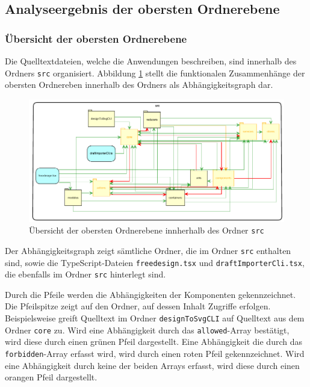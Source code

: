\subsection{Analyseergebnis der obersten Ordnerebene}
\subsubsection{Übersicht der obersten Ordnerebene}
\label{sec:overview}
Die Quelltextdateien, welche die Anwendungen beschreiben, sind innerhalb des Ordners \lstinline|src| organisiert. 
Abbildung \ref{fig:obersteOrdnerebene} stellt die funktionalen Zusammenhänge der obersten Ordnereben innerhalb des Ordners als Abhängigkeitsgraph dar.  
\begin{figure}[H]
	\centering
    \caption{Übersicht der obersten Ordnerebene innherhalb des Ordner \lstinline|src|}
	\label{fig:obersteOrdnerebene}
	\includegraphics{diagrams/Ist-Architektur/Projektuebersicht.pdf}
\end{figure}


Der Abhängigkeitsgraph zeigt sämtliche Ordner, die im Ordner \lstinline|src| enthalten sind, sowie die TypeScript-Dateien \lstinline|freedesign.tsx| und \lstinline|draftImporterCli.tsx|, die ebenfalls im Ordner \lstinline|src| hinterlegt sind.  

Durch die Pfeile werden die Abhängigkeiten der Komponenten gekennzeichnet. Die Pfeilspitze zeigt auf den Ordner, auf dessen Inhalt Zugriffe erfolgen. Beispielsweise greift Quelltext im Ordner \lstinline|designToSvgCLI| auf Quelltext aus dem Ordner \lstinline|core| zu.
Wird eine Abhängigkeit durch das \lstinline|allowed|-Array bestätigt, wird diese durch einen grünen Pfeil dargestellt. Eine Abhängigkeit die durch das \lstinline|forbidden|-Array erfasst wird, wird durch einen roten Pfeil gekennzeichnet. Wird eine Abhängigkeit durch keine der beiden Arrays erfasst, wird diese durch einen orangen Pfeil dargestellt.

